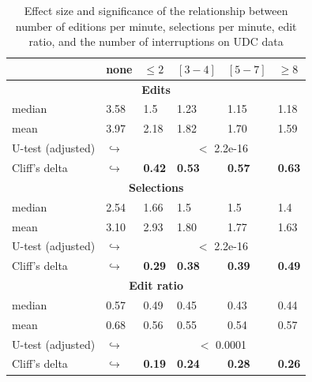 \begin{table}[ht!]
	\small
	\caption{Effect size and significance of the relationship between number of editions per minute, selections per minute, edit ratio, and the number of interruptions on UDC data} 
	\label{tbl:p_value_udc}
	\centering
	\begin{tabular}{l | p{0.75cm} | p{1.2cm} | p{1.2cm} | p{1.2cm} |p{1.2cm}} 
		\hline
		& none & $\leq 2$ & $[3 - 4]$ & $[5 - 7]$ & $\geq 8$  \\  
		\hline
		\hline
		\multicolumn{6}{c}{\textbf{Edits}} \\
		\hline
		median & 3.58 & 1.5 & 1.23 & 1.15 & 1.18 \\
		\cline{2-6} 
		mean & 3.97 &	2.18 & 1.82 & 1.70 & 1.59 \\ 
		\cline{3-6} 
		U-test (adjusted) & $\hookrightarrow$ & \multicolumn{4}{c}{$<$ 2.2e-16} \\
		\cline{3-6} 
		Cliff's delta & $\hookrightarrow$	& \textbf{0.42} & \textbf{0.53} & \textbf{0.57} & \textbf{0.63}    \\
		
		
		\hline
		\multicolumn{6}{c}{\textbf{Selections}} \\
		\hline 
		median & 2.54 & 1.66 & 1.5 & 1.5 & 1.4 \\
		\cline{2-6} 
		mean & 3.10 &	2.93 & 1.80 & 1.77 & 1.63  \\ 
		\cline{3-6} 
		U-test (adjusted)& $\hookrightarrow$ & \multicolumn{4}{c}{$<$ 2.2e-16} \\
		\cline{3-6} 
		Cliff's delta & $\hookrightarrow$	& \textbf{0.29} & \textbf{0.38} & \textbf{0.39} & \textbf{0.49} \\  
		\hline
		
		\multicolumn{6}{c}{\textbf{Edit ratio}} \\
		\hline 
		median & 0.57 & 0.49 & 0.45 & 0.43 & 0.44 \\
		\cline{2-6} 
		mean & 0.68 & 0.56 & 0.55 & 0.54 & 0.57 \\ 
		\cline{3-6} 
		\cline{3-6} 
		U-test (adjusted) &  $\hookrightarrow$& \multicolumn{4}{c}{$<$ 0.0001} \\
		\cline{3-6} 
		Cliff's delta & $\hookrightarrow$ & \textbf{0.19} & \textbf{0.24} & \textbf{0.28} & \textbf{0.26} \\ 
		\hline
		
	\end{tabular}
\end{table}

